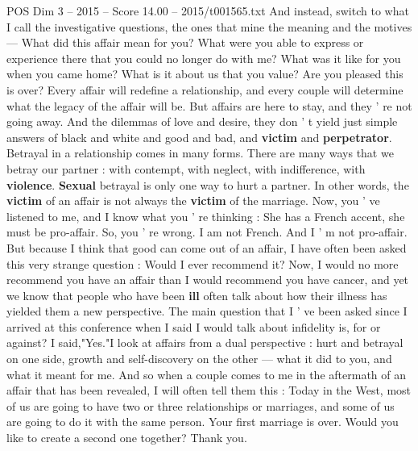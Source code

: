 \begin{textsample}{POS Dim 3 – 2015 – Score 14.00 – 2015/t001565.txt}
And instead, switch to what I call the investigative questions, the ones that mine the meaning and the motives — What did this affair mean for you?
What were you able to express or experience there that you could no longer do with me?
What was it like for you when you came home?
What is it about us that you value?
Are you pleased this is over?
Every affair will redefine a relationship, and every couple will determine what the legacy of the affair will be.
But affairs are here to stay, and they ' re not going away.
And the dilemmas of love and desire, they don ' t yield just simple answers of black and white and good and bad, and \textbf{victim} and \textbf{perpetrator}.
Betrayal in a relationship comes in many forms.
There are many ways that we betray our partner : with contempt, with neglect, with indifference, with \textbf{violence}. \textbf{Sexual} betrayal is only one way to hurt a partner.
In other words, the \textbf{victim} of an affair is not always the \textbf{victim} of the marriage.
Now, you ' ve listened to me, and I know what you ' re thinking : She has a French accent, she must be pro-affair.
So, you ' re wrong.
I am not French.
And I ' m not pro-affair.
But because I think that good can come out of an affair, I have often been asked this very strange question : Would I ever recommend it?
Now, I would no more recommend you have an affair than I would recommend you have cancer, and yet we know that people who have been \textbf{ill} often talk about how their illness has yielded them a new perspective.
The main question that I ' ve been asked since I arrived at this conference when I said I would talk about infidelity is, for or against?
I said,"Yes."I look at affairs from a dual perspective : hurt and betrayal on one side, growth and self-discovery on the other — what it did to you, and what it meant for me.
And so when a couple comes to me in the aftermath of an affair that has been revealed, I will often tell them this : Today in the West, most of us are going to have two or three relationships or marriages, and some of us are going to do it with the same person.
Your first marriage is over.
Would you like to create a second one together?
Thank you.

\end{textsample}
